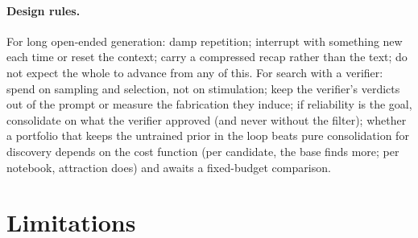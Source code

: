 \documentclass[11pt]{article}
\begin{document}
\paragraph{Design rules.} For long open-ended generation: damp repetition;
interrupt with something new each time or reset the context; carry a
compressed recap rather than the text; do not expect the whole to advance
from any of this. For search with a verifier: spend on sampling and
selection, not on stimulation; keep the verifier's verdicts out of the
prompt or measure the fabrication they induce; if reliability is the goal,
consolidate on what the verifier approved (and never without the
filter); whether a portfolio that keeps the untrained prior in the loop
beats pure consolidation for discovery depends on the cost function
(per candidate, the base finds more; per notebook, attraction does) and
awaits a fixed-budget comparison.

\section{Limitations}
\label{sec:limitations}
\end{document}
